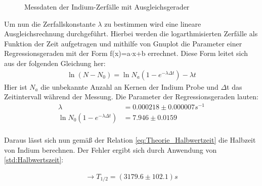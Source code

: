 

\begin{figure}[htbp]
\caption{Messdaten der Indium-Zerfälle mit Ausgleichsgerader}
\label{fig:Abbildung}
\end{figure}
Um nun die Zerfallskonstante $\lambda$ zu bestimmen wird eine lineare Ausgleichsrechnung durchgeführt. Hierbei werden die logarthmisierten Zerfälle als Funktion der Zeit aufgetragen und mithilfe von Gnuplot die Parameter einer Regressionsgeraden mit der Form f(x)=a$\cdot$x+b errechnet. Diese Form leitet sich aus der folgenden Gleichung her:
\begin{align*}
\ln(N-N_0)=\ln N_a(1-e^{-\lambda\Delta t})-\lambda t
\end{align*}
Hier ist $N_a$ die unbekannte Anzahl an Kernen der Indium Probe und $\Delta$t das Zeitintervall während der Messung. Die Parameter der Regressionsgeraden lauten:
\begin{align*}
\lambda&=0.000218\pm 0.000007s^{-1}\\
\ln N_0(1-e^{-\lambda\Delta t})&=7.946\pm0.0159\\
\end{align*}

Daraus lässt sich nun gemäß der Relation \cref{eq:Theorie_Halbwertzeit} die Halbzeit von Indium berechnen. Der Fehler ergibt sich durch Anwendung von \cref{std:Halbwertszeit}:

\begin{align*}
\rightarrow T_{1/2}=(3179.6\pm 102.1)s
\end{align*}